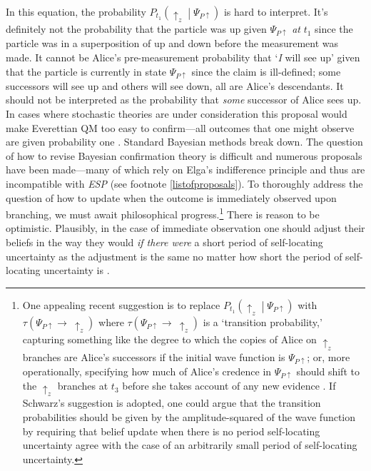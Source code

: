 \documentclass[12pt,onecolumn,secnumarabic,amsmath,amssymb,balancelastpage,nofootinbib]{article}
\begin{document}
In this equation, the probability $P_{t_1}\left(\uparrow_z\middle|\Psi_{P\uparrow}\right)$ is hard to interpret.  It's definitely not the probability that the particle was up given $\Psi_{P\uparrow}$ \emph{at} $t_1$ since the particle was in a superposition of up and down before the measurement was made.  It cannot be Alice's pre-measurement probability that `\emph{I} will see up' given that the particle is currently in state $\Psi_{P\uparrow}$ since the claim is ill-defined; some successors will see up and others will see down, all are Alice's descendants.  It should not be interpreted as the probability that \emph{some} successor of Alice sees up.  In cases where stochastic theories are under consideration this proposal would make Everettian QM too easy to confirm---all outcomes that one might observe are given probability one \citep[see][p. 140]{greaves2007b}.  {Standard Bayesian methods break down.}  The question of how to revise Bayesian confirmation theory is difficult and numerous proposals have been made---many of which rely on Elga's indifference principle and thus are incompatible with \emph{ESP} (see footnote \ref{listofproposals}).  To thoroughly address the question of how to update when the outcome is immediately observed upon branching, we must await philosophical progress.\footnote{One appealing recent suggestion is to replace $P_{t_1}\left(\uparrow_z\middle|\Psi_{P\uparrow}\right)$ with $\tau\!\left(\Psi_{P\uparrow}\rightarrow\:\uparrow_z\right)$ where $\tau\!\left(\Psi_{P\uparrow}\rightarrow\:\uparrow_z\right)$ is a `transition probability,' capturing something like the degree to which the copies of Alice on $\uparrow_z$ branches are Alice's successors if the initial wave function is $\Psi_{P\uparrow}$; or, more operationally, specifying how much of Alice's credence in $\Psi_{P\uparrow}$ should shift to the $\uparrow_z$ branches at $t_3$ before she takes account of any new evidence \citep{schwarz}.  If Schwarz's suggestion is adopted, one could argue that the transition probabilities should be given by the amplitude-squared of the wave function by requiring that belief update when there is no period self-locating uncertainty agree with the case of an arbitrarily small period of self-locating uncertainty.} {There is reason} to be optimistic.  {Plausibly,} in the case of immediate observation one should adjust their beliefs in the way they would \emph{if there were} a short period of self-locating uncertainty as the adjustment is the same no matter how short the period of self-locating uncertainty is \citep[p. 107]{tappenden2011}.
\end{document}
